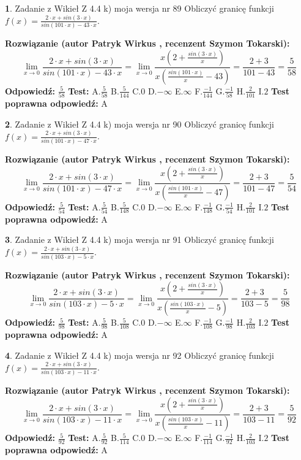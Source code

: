 \documentclass[12pt, a4paper]{article}
\theoremstyle{definition} %
\newtheorem{zad}{}
\newcommand{\zadStart}[1]{\begin{zad}#1\newline}
\newcommand{\zadStop}{\end{zad}}
\newcommand{\rozwStart}[2]{\noindent \textbf{Rozwiązanie (autor #1 , recenzent #2): }\newline}
\newcommand{\rozwStop}{\newline}
\newcommand{\odpStart}{\noindent \textbf{Odpowiedź:}\newline}
\newcommand{\odpStop}{\newline}
\newcommand{\testStart}{\noindent \textbf{Test:}\newline}
\newcommand{\testStop}{\newline}
\newcommand{\kluczStart}{\noindent \textbf{Test poprawna odpowiedź:}\newline}
\newcommand{\kluczStop}{\newline}
\begin{document}
\zadStart{Zadanie z Wikieł Z 4.4 k) moja wersja nr 89}
Obliczyć granicę funkcji $f(x)=\frac{2\cdot x +sin(3\cdot x)}{sin(101\cdot x) -43\cdot x}$.
\zadStop
\rozwStart{Patryk Wirkus}{Szymon Tokarski}
$$\lim\limits_{x\to 0}\frac{2\cdot x +sin(3\cdot x)}{sin(101\cdot x) -43\cdot x}
=\lim\limits_{x\to 0}\frac{x(2+\frac{sin(3\cdot x)}{x})}{x(\frac{sin(101\cdot x)}{x}-43)}
=\frac{2+3}{101-43} = \frac{5}{58}$$
\rozwStop
\odpStart
$\frac{5}{58}$
\odpStop
\testStart
A.$\frac{5}{58}$
B.$\frac{5}{144}$
C.$0$
D.$-\infty$
E.$\infty$
F.$\frac{-1}{144}$
G.$\frac{-1}{58}$
H.$\frac{2}{101}$
I.$2$
\testStop
\kluczStart
A
\kluczStop



\zadStart{Zadanie z Wikieł Z 4.4 k) moja wersja nr 90}
Obliczyć granicę funkcji $f(x)=\frac{2\cdot x +sin(3\cdot x)}{sin(101\cdot x) -47\cdot x}$.
\zadStop
\rozwStart{Patryk Wirkus}{Szymon Tokarski}
$$\lim\limits_{x\to 0}\frac{2\cdot x +sin(3\cdot x)}{sin(101\cdot x) -47\cdot x}
=\lim\limits_{x\to 0}\frac{x(2+\frac{sin(3\cdot x)}{x})}{x(\frac{sin(101\cdot x)}{x}-47)}
=\frac{2+3}{101-47} = \frac{5}{54}$$
\rozwStop
\odpStart
$\frac{5}{54}$
\odpStop
\testStart
A.$\frac{5}{54}$
B.$\frac{5}{148}$
C.$0$
D.$-\infty$
E.$\infty$
F.$\frac{-1}{148}$
G.$\frac{-1}{54}$
H.$\frac{2}{101}$
I.$2$
\testStop
\kluczStart
A
\kluczStop



\zadStart{Zadanie z Wikieł Z 4.4 k) moja wersja nr 91}
Obliczyć granicę funkcji $f(x)=\frac{2\cdot x +sin(3\cdot x)}{sin(103\cdot x) -5\cdot x}$.
\zadStop
\rozwStart{Patryk Wirkus}{Szymon Tokarski}
$$\lim\limits_{x\to 0}\frac{2\cdot x +sin(3\cdot x)}{sin(103\cdot x) -5\cdot x}
=\lim\limits_{x\to 0}\frac{x(2+\frac{sin(3\cdot x)}{x})}{x(\frac{sin(103\cdot x)}{x}-5)}
=\frac{2+3}{103-5} = \frac{5}{98}$$
\rozwStop
\odpStart
$\frac{5}{98}$
\odpStop
\testStart
A.$\frac{5}{98}$
B.$\frac{5}{108}$
C.$0$
D.$-\infty$
E.$\infty$
F.$\frac{-1}{108}$
G.$\frac{-1}{98}$
H.$\frac{2}{103}$
I.$2$
\testStop
\kluczStart
A
\kluczStop



\zadStart{Zadanie z Wikieł Z 4.4 k) moja wersja nr 92}
Obliczyć granicę funkcji $f(x)=\frac{2\cdot x +sin(3\cdot x)}{sin(103\cdot x) -11\cdot x}$.
\zadStop
\rozwStart{Patryk Wirkus}{Szymon Tokarski}
$$\lim\limits_{x\to 0}\frac{2\cdot x +sin(3\cdot x)}{sin(103\cdot x) -11\cdot x}
=\lim\limits_{x\to 0}\frac{x(2+\frac{sin(3\cdot x)}{x})}{x(\frac{sin(103\cdot x)}{x}-11)}
=\frac{2+3}{103-11} = \frac{5}{92}$$
\rozwStop
\odpStart
$\frac{5}{92}$
\odpStop
\testStart
A.$\frac{5}{92}$
B.$\frac{5}{114}$
C.$0$
D.$-\infty$
E.$\infty$
F.$\frac{-1}{114}$
G.$\frac{-1}{92}$
H.$\frac{2}{103}$
I.$2$
\testStop
\kluczStart
A
\kluczStop
\end{document}
